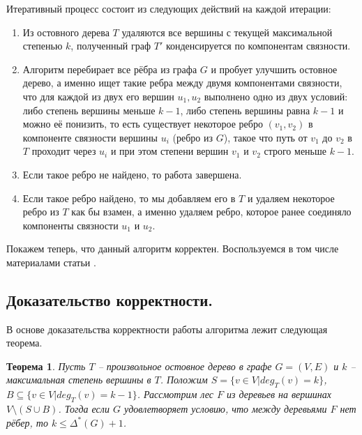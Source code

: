 \documentclass[a4paper,11pt]{article}
\renewcommand{\le}{\ensuremath{\leqslant}}
\theoremstyle{plain}
\newtheorem{theorem}{Теорема}[section]
\theoremstyle{definition}
\theoremstyle{remark}
\begin{document}
Итеративный процесс состоит из следующих действий на каждой итерации:

\begin{enumerate}
  \item Из остовного дерева $T$ удаляются все вершины с текущей максимальной степенью $k$, полученный граф $T'$ конденсируется по компонентам связности.
  \item Алгоритм перебирает все рёбра из графа $G$ и пробует улучшить остовное дерево, а именно ищет такие ребра между двумя компонентами связности, что для каждой из двух его вершин $u_1, u_2$ выполнено одно из двух условий: либо степень вершины меньше $k-1$, либо степень вершины равна $k-1$ и можно её понизить, то есть существует некоторое ребро $(v_1, v_2)$ в компоненте связности вершины $u_i$ (ребро из $G$), такое что путь от $v_1$ до $v_2$ в $T$ проходит через $u_i$ и при этом степени вершин $v_1$ и $v_2$ строго меньше $k-1$.
  \item Если такое ребро не найдено, то работа завершена.
  \item Если такое ребро найдено, то мы добавляем его в $T$ и удаляем некоторое ребро из $T$ как бы взамен, а именно удаляем ребро, которое ранее соединяло компоненты связности $u_1$ и $u_2$.
\end{enumerate}

Покажем теперь, что данный алгоритм корректен. Воспользуемся в том числе материалами статьи \cite{ref2}.

\subsection{Доказательство корректности.}

В основе доказательства корректности работы алгоритма лежит следующая теорема.

\begin{theorem}
  Пусть $T$ -- произвольное остовное дерево в графе $G = (V, E)$ и $k$ -- максимальная степень вершины в $T$. Положим $S = \{v\in V | deg_T(v) = k\}$, $B \subseteq \{v \in V | deg_T(v) = k-1\}$. Рассмотрим лес $F$ из деревьев на вершинах $V \setminus (S \cup B)$. Тогда если $G$ удовлетворяет условию, что между деревьями $F$ нет рёбер, то $k \le \Delta^*(G) + 1$.
\end{theorem}
\end{document}
